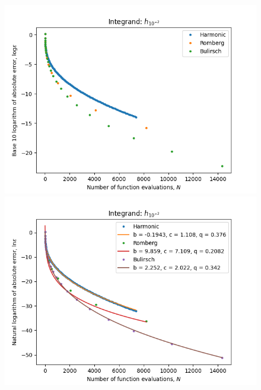 \begin{figure}[H]
\centering
\begin{minipage}{0.45\textwidth}
\centering
\includegraphics[scale=0.45]{romberg_plots/h_hundredth_hp.png}
\end{minipage}
\begin{minipage}{0.45\textwidth}
\centering
\includegraphics[scale=0.45]{romberg_plots/h_hundredth_hp_trend.png}
\end{minipage}
\end{figure}

